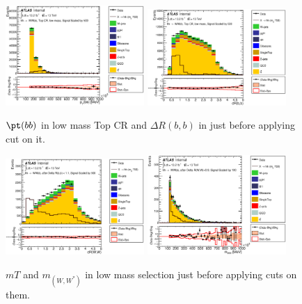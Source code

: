 \begin{figure}[!h]
\begin{center}
\includegraphics*[width=0.47\textwidth] {chapters/dihiggs/figures/ControlPlots/CR1/C_opt700_bbpt150_bbPt.eps}
\includegraphics*[width=0.47\textwidth] {chapters/dihiggs/figures/ControlPlots/CR1/C_opt700_bbpt150_drbb.eps}
\caption [$\pt(bb)$ in low mass Top CR and $\Delta R(b,b)$ in just before applying cut on it.] {$\pt(bb)$ in low mass Top CR and $\Delta R(b,b)$ in just before applying cut on it. }
\end{center}
\label{fig:topcr_bbpt_drbb}
\end{figure}

\begin{figure}[!h]
\begin{center}
\includegraphics*[width=0.47\textwidth] {chapters/dihiggs/figures/ControlPlots/CR1/C_opt700_bbpt150_drbb11_drww.eps}
\includegraphics*[width=0.47\textwidth] {chapters/dihiggs/figures/ControlPlots/CR1/C_opt700_bbpt150_drbb11_drww09_WWMass.eps}
\caption [$mT$ and $m_{(W,W^{\ast})}$ in low mass selection just before applying cuts on them.] {$mT$ and $m_{(W,W^{\ast})}$ in low mass selection just before applying cuts on them.  }
\end{center}
\label{fig:drww_mww}
\end{figure}

